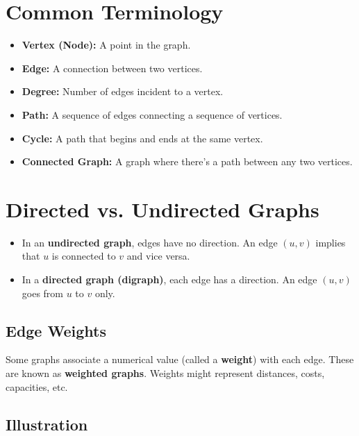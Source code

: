 \documentclass{article}
\begin{document}
\section{Common Terminology}

\begin{itemize}
    \item \textbf{Vertex (Node):} A point in the graph.
    \item \textbf{Edge:} A connection between two vertices.
    \item \textbf{Degree:} Number of edges incident to a vertex.
    \item \textbf{Path:} A sequence of edges connecting a sequence of vertices.
    \item \textbf{Cycle:} A path that begins and ends at the same vertex.
    \item \textbf{Connected Graph:} A graph where there's a path between any two vertices.
\end{itemize}

\section{Directed vs. Undirected Graphs}

\begin{itemize}
    \item In an \textbf{undirected graph}, edges have no direction. An edge $(u, v)$ implies that $u$ is connected to $v$ and vice versa.
    \item In a \textbf{directed graph (digraph)}, each edge has a direction. An edge $(u, v)$ goes from $u$ to $v$ only.
\end{itemize}

\subsection*{Edge Weights}

Some graphs associate a numerical value (called a \textbf{weight}) with each edge. These are known as \textbf{weighted graphs}. Weights might represent distances, costs, capacities, etc.

\subsection*{Illustration}

\begin{center}
\end{center}
\end{document}
